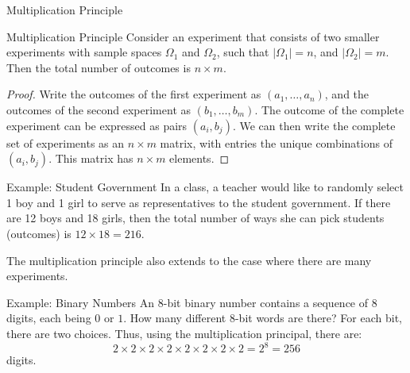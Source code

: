 \begin{frame}[allowframebreaks]{Multiplication Principle}

  \begin{block}{Multiplication Principle}
  Consider an experiment that consists of two smaller experiments with sample spaces $\Omega_1$ and $\Omega_2$, such that $|\Omega_1| = n$, and $|\Omega_2| = m$. Then the total number of outcomes is $n \times m$.
  \end{block}
  
  \begin{proof}
    Write the outcomes of the first experiment as $(a_1, \ldots, a_n)$, and the outcomes of the second experiment as $(b_1, \ldots, b_m)$. The outcome of the complete experiment can be expressed as pairs $(a_i, b_j)$. We can then write the complete set of experiments as an $n \times m$ matrix, with entries the unique combinations of $(a_i, b_j)$. This matrix has $n \times m$ elements.
  \end{proof}
  
  \begin{exampleblock}{Example: Student Government}
    In a class, a teacher would like to randomly select 1 boy and 1 girl to serve as representatives to the student government. If there are 12 boys and 18 girls, then the total number of ways she can pick students (outcomes) is $12 \times 18 = 216$.
  \end{exampleblock}
  
  The multiplication principle also extends to the case where there are many experiments.
  
  \begin{exampleblock}{Example: Binary Numbers}
    An 8-bit binary number contains a sequence of 8 digits, each being $0$ or $1$. How many different $8$-bit words are there? For each bit, there are two choices. Thus, using the multiplication principal, there are:
    $$
    2 \times 2 \times 2 \times 2 \times 2 \times 2 \times 2 \times 2 = 2^8 = 256
    $$
    digits.
  \end{exampleblock}
\end{frame}


